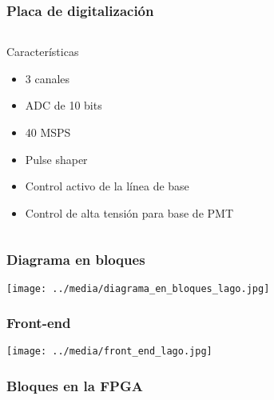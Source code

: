 \documentclass{beamer}
\begin{document}
\begin{frame}
	\frametitle{Placa de digitalización}
\begin{columns}
	\begin{column}{0.40\textwidth}
		\begin{block}{Características}
    	\begin{itemize}[<+->]
      	\item 3 canales
      	\item ADC de 10 bits
      	\item 40 MSPS 
				\item Pulse shaper
				\item Control activo de la línea de base
				\item Control de alta tensión para base de PMT
    	\end{itemize}
		\end{block}
	\end{column} 
 	\begin{column}{0.55\textwidth}
 \end{column}
\end{columns}
\end{frame} 

\begin{frame}
	\frametitle{Diagrama en bloques}
	\begin{block}{}
  	\texttt{[image: ../media/diagrama\_en\_bloques\_lago.jpg]}
	\end{block}
\end{frame} 

\begin{frame}
	\frametitle{Front-end}
	\begin{block}{}
  	\texttt{[image: ../media/front\_end\_lago.jpg]}
	\end{block}
\end{frame} 

\begin{frame}
	\frametitle{Bloques en la FPGA}
	\begin{center}
	\end{center}
\end{frame} 
\end{document}
